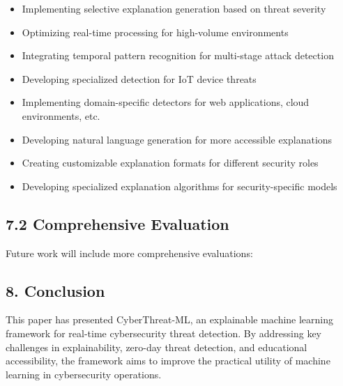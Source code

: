 \documentclass[12pt]{article}
\begin{document}
\begin{itemize}
\item Implementing selective explanation generation based on threat severity
\end{itemize}

\begin{itemize}
\item Optimizing real-time processing for high-volume environments
\end{itemize}

\begin{itemize}
\item Integrating temporal pattern recognition for multi-stage attack detection
\end{itemize}

\begin{itemize}
\item Developing specialized detection for IoT device threats
\end{itemize}

\begin{itemize}
\item Implementing domain-specific detectors for web applications, cloud environments, etc.
\end{itemize}

\begin{itemize}
\item Developing natural language generation for more accessible explanations
\end{itemize}

\begin{itemize}
\item Creating customizable explanation formats for different security roles
\end{itemize}

\begin{itemize}
\item Developing specialized explanation algorithms for security-specific models
\end{itemize}

\subsection{7.2 Comprehensive Evaluation}
Future work will include more comprehensive evaluations:

\subsection{8. Conclusion}
This paper has presented CyberThreat-ML, an explainable machine learning framework for real-time cybersecurity threat detection. By addressing key challenges in explainability, zero-day threat detection, and educational accessibility, the framework aims to improve the practical utility of machine learning in cybersecurity operations.
\end{document}
